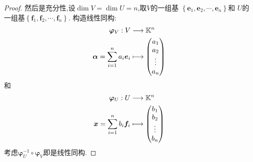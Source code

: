 {\begin{proof}
        然后是充分性,设$\dim V=\dim U=n$,取$V$的一组基
        $\left\{\bm{e}_1,\bm{e}_2,\cdots,\bm{e}_n\right\}$和
        $U$的一组基$\left\{\bm{f}_1,\bm{f}_2,\cdots,\bm{f}_n\right\}$.
        构造线性同构:
        \begin{align*}
            \bm{\varphi}_V:
            V & \longrightarrow \mathbb{K} ^n    \\
            \bm{\alpha} =
            \sum_{i = 1}^{n}a_i\bm{e}_i
              & \longmapsto \begin{pmatrix}
                                a_1    \\
                                a_2    \\
                                \vdots \\
                                a_n
                            \end{pmatrix}
        \end{align*}
        和
        \begin{align*}
            \bm{\varphi}_U:
            U & \longrightarrow \mathbb{K} ^n    \\
            \bm{x} =
            \sum_{i = 1}^{n}b_i\bm{f}_i
              & \longmapsto \begin{pmatrix}
                                b_1    \\
                                b_2    \\
                                \vdots \\
                                b_n
                            \end{pmatrix}
        \end{align*}
        考虑$\bm{\varphi}_U^{-1}\circ \bm{\varphi}_V$即是线性同构.
    \end{proof}
}
